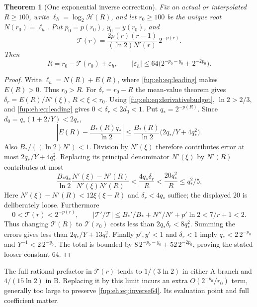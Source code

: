 \documentclass[11pt,letterpaper]{article}
\newtheorem{theorem}{Theorem}[section]
\theoremstyle{definition}\newtheorem{definition}[theorem]{Definition}
\theoremstyle{remark}\newtheorem{remark}[theorem]{Remark}
\begin{document}
\begin{theorem}[One exponential inverse correction]\label{fup:eh:thm:inverse}
Fix an actual or interpolated $R\ge100$, write
$\ell_h=\log_2\mathcal H(R)$, and let $r_0\ge100$ be the
unique root $N(r_0)=\ell_h$. Put $p_0=p(r_0)$, $y_0=y(r_0)$,
and
\[
 \mathcal T(r)=\frac{2p(r)(r-1)}{(\ln2)N'(r)}\,2^{-p(r)}.
\]
Then
\begin{equation}\label{fup:eh:eq:inverse64}
 R=r_0-\mathcal T(r_0)+\varepsilon_h,\qquad
 |\varepsilon_h|\le64\bigl(2^{-p_0-y_0}+2^{-2p_0}\bigr).
\end{equation}
\end{theorem}
\begin{proof}
Write $\ell_h=N(R)+E(R)$, where \eqref{fup:eh:eq:leading} makes
$E(R)>0$. Thus $r_0>R$. For $\delta_r=r_0-R$ the mean-value
theorem gives $\delta_r=E(R)/N'(\xi)$, $R<\xi<r_0$.
Using \eqref{fup:eh:eq:derivativebudget}, $\ln2>2/3$, and
\eqref{fup:eh:eq:leading} gives $0<\delta_r<2d_0<1$.
Put $q_*=2^{-p(R)}$. Since $d_0=q_*(1+2/Y)<2q_*$,
\[
 \left|E(R)-\frac{B_*(R)q_*}{\ln2}\right|
 \le\frac{B_*(R)}{\ln2}\bigl(2q_*/Y+4q_*^2\bigr).
\]
Also $B_*/((\ln2)N')<1$. Division by $N'(\xi)$ therefore
contributes error at most $2q_*/Y+4q_*^2$.
Replacing its principal denominator $N'(\xi)$ by $N'(R)$
contributes at most
\[
 \frac{B_*q_*}{\ln2}
 \frac{N'(\xi)-N'(R)}{N'(\xi)N'(R)}
 <\frac{4q_*\delta_r}{R}<\frac{20q_*^2}{R}\le q_*^2/5.
\]
Here $N'(\xi)-N'(R)<12\xi(\xi-R)$ and
$\delta_r<4q_*$ suffice; the displayed $20$ is deliberately loose.
Furthermore
\[
 0<\mathcal T(r)<2^{-p(r)},\qquad
 |\mathcal T'/\mathcal T|
 \le B_*'/B_*+N''/N'+p'\ln2<7/r+1<2.
\]
Thus changing $\mathcal T(R)$ to $\mathcal T(r_0)$ costs less
than $2q_*\delta_r<8q_*^2$. Summing the errors gives less than
$2q_*/Y+13q_*^2$.
Finally $p',y'<1$ and $\delta_r<1$ imply
$q_*<2\,2^{-p_0}$ and $Y^{-1}<2\,2^{-y_0}$.
The total is bounded by
$8\,2^{-p_0-y_0}+52\,2^{-2p_0}$, proving the stated looser
constant $64$.
\end{proof}

The full rational prefactor in $\mathcal T(r)$ tends to
$1/(3\ln2)$ in either A branch and $4/(15\ln2)$ in B.
Replacing it by this limit incurs an extra
$O(2^{-p_0}/r_0)$ term, generally too large to preserve
\eqref{fup:eh:eq:inverse64}. Its evaluation point and full coefficient matter.
\end{document}
